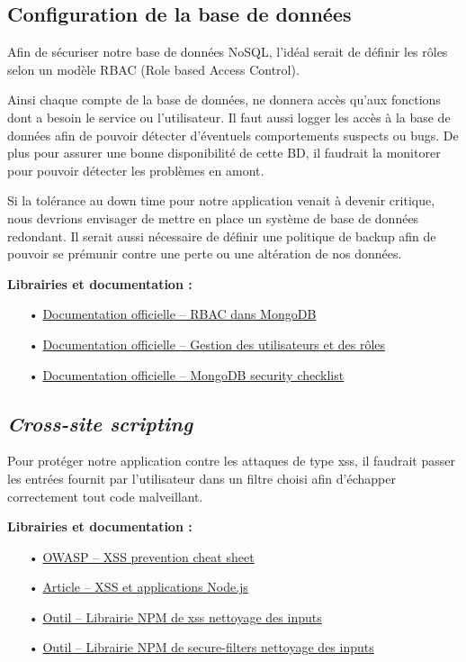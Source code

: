 \subsection{Configuration de la base de données}
\label{ssec:cm-configdb}

Afin de sécuriser notre base de données NoSQL, l'idéal serait de définir les rôles selon un modèle RBAC (Role based Access Control). 

Ainsi chaque compte de la base de données, ne donnera accès qu'aux fonctions dont a besoin le service ou l'utilisateur. Il faut aussi logger les accès à la base de données afin de pouvoir détecter d'éventuels comportements suspects ou bugs. De plus pour assurer une bonne disponibilité de cette BD, il faudrait la monitorer pour pouvoir détecter les problèmes en amont. 

Si la tolérance au down time pour notre application venait à devenir critique, nous devrions envisager de mettre en place un système de base de données redondant. Il serait aussi nécessaire de définir une politique de backup afin de pouvoir se prémunir contre une perte ou une altération de nos données.  

\medskip
\textbf{Librairies et documentation :}

\begin{itemize}
\item[•] \href{https://docs.mongodb.com/manual/core/authorization/}{Documentation officielle -- RBAC dans MongoDB}
\item[•] \href{https://docs.mongodb.com/manual/tutorial/manage-users-and-roles/}{Documentation officielle -- Gestion des utilisateurs et des rôles}
\item[•] \href{https://docs.mongodb.com/manual/administration/security-checklist/}{Documentation officielle -- MongoDB security checklist}
\end{itemize}

\subsection{\emph{Cross-site scripting}}
\label{ssec:cm-xss}

Pour protéger notre application contre les attaques de type xss, il faudrait passer les entrées fournit par l'utilisateur dans un filtre choisi afin d'échapper correctement tout code malveillant. 

\medskip
\textbf{Librairies et documentation :}

\begin{itemize}
\item[•] \href{https://www.owasp.org/index.php/XSS_(Cross_Site_Scripting)_Prevention_Cheat_Sheet}{OWASP -- XSS prevention cheat sheet}
\item[•] \href{http://scottksmith.com/blog/2015/06/22/secure-node-apps-against-owasp-top-10-cross-site-scripting/}{Article -- XSS et applications Node.js}
\item[•] \href{https://www.npmjs.com/package/xss}{Outil -- Librairie NPM de xss nettoyage des inputs}
\item[•] \href{https://www.npmjs.com/package/secure-filters}{Outil -- Librairie NPM de secure-filters nettoyage des inputs}
\end{itemize}

